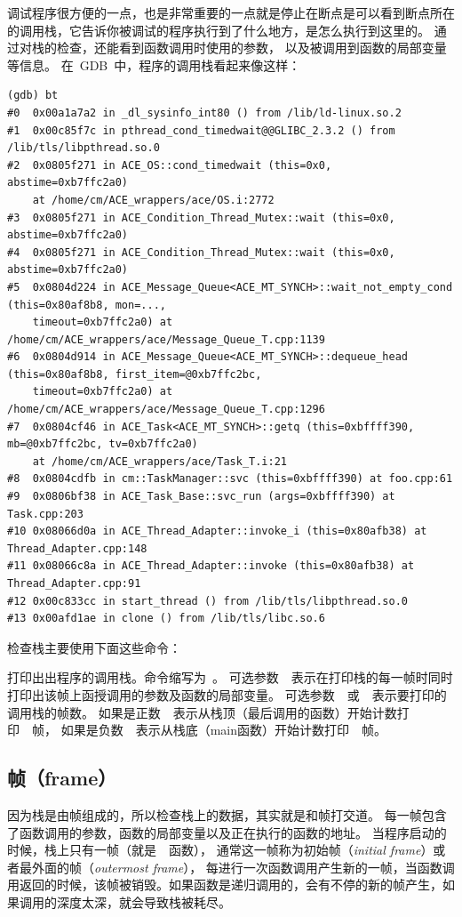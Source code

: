 调试程序很方便的一点，也是非常重要的一点就是停止在断点是可以看到断点所在的调用栈，它告诉你被调试的程序执行到了什么地方，是怎么执行到这里的。
通过对栈的检查，还能看到函数调用时使用的参数，
以及被调用到函数的局部变量等信息。
在~GDB~中，程序的调用栈看起来像这样：
\begin{lstlisting}
(gdb) bt
#0  0x00a1a7a2 in _dl_sysinfo_int80 () from /lib/ld-linux.so.2
#1  0x00c85f7c in pthread_cond_timedwait@@GLIBC_2.3.2 () from /lib/tls/libpthread.so.0
#2  0x0805f271 in ACE_OS::cond_timedwait (this=0x0, abstime=0xb7ffc2a0)
    at /home/cm/ACE_wrappers/ace/OS.i:2772
#3  0x0805f271 in ACE_Condition_Thread_Mutex::wait (this=0x0, abstime=0xb7ffc2a0)
#4  0x0805f271 in ACE_Condition_Thread_Mutex::wait (this=0x0, abstime=0xb7ffc2a0)
#5  0x0804d224 in ACE_Message_Queue<ACE_MT_SYNCH>::wait_not_empty_cond (this=0x80af8b8, mon=...,
    timeout=0xb7ffc2a0) at /home/cm/ACE_wrappers/ace/Message_Queue_T.cpp:1139
#6  0x0804d914 in ACE_Message_Queue<ACE_MT_SYNCH>::dequeue_head (this=0x80af8b8, first_item=@0xb7ffc2bc,
    timeout=0xb7ffc2a0) at /home/cm/ACE_wrappers/ace/Message_Queue_T.cpp:1296
#7  0x0804cf46 in ACE_Task<ACE_MT_SYNCH>::getq (this=0xbffff390, mb=@0xb7ffc2bc, tv=0xb7ffc2a0)
    at /home/cm/ACE_wrappers/ace/Task_T.i:21
#8  0x0804cdfb in cm::TaskManager::svc (this=0xbffff390) at foo.cpp:61
#9  0x0806bf38 in ACE_Task_Base::svc_run (args=0xbffff390) at Task.cpp:203
#10 0x08066d0a in ACE_Thread_Adapter::invoke_i (this=0x80afb38) at Thread_Adapter.cpp:148
#11 0x08066c8a in ACE_Thread_Adapter::invoke (this=0x80afb38) at Thread_Adapter.cpp:91
#12 0x00c833cc in start_thread () from /lib/tls/libpthread.so.0
#13 0x00afd1ae in clone () from /lib/tls/libc.so.6
\end{lstlisting}

检查栈主要使用下面这些命令：

\noindent
{}  

打印出出程序的调用栈。命令缩写为~。
可选参数~~表示在打印栈的每一帧时同时打印出该帧上函授调用的参数及函数的局部变量。
可选参数~~或~~表示要打印的调用栈的帧数。
如果是正数~~表示从栈顶（最后调用的函数）开始计数打印~~帧，
如果是负数~~表示从栈底（main函数）开始计数打印~~帧。


\subsection{帧（frame）}
因为栈是由帧组成的，所以检查栈上的数据，其实就是和帧打交道。
每一帧包含了函数调用的参数，函数的局部变量以及正在执行的函数的地址。
当程序启动的时候，栈上只有一帧（就是~~函数），
通常这一帧称为初始帧（\emph{initial frame}）或者最外面的帧（\emph{outermost frame}），
每进行一次函数调用产生新的一帧，当函数调用返回的时候，该帧被销毁。如果函数是递归调用的，会有不停的新的帧产生，如果调用的深度太深，就会导致栈被耗尽。

